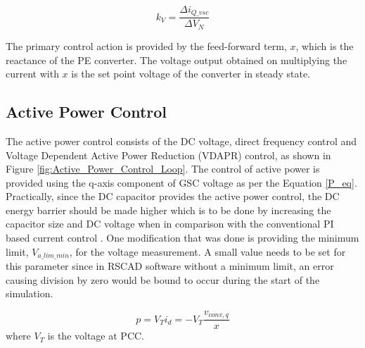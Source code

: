 \begin{equation}
    k_V = \frac{\Delta i_{Q\_vsc}}{\Delta V_N }
\end{equation}

The primary control action is provided by the feed-forward term, $x$, which is the reactance of the \gls{PE} converter. The voltage output obtained on multiplying the current with $x$ is the set point voltage of the converter in steady state.

\subsection{Active Power Control}\label{Active_power_DVC_theory}
The active power control consists of the \gls{DC} voltage, direct frequency control and Voltage Dependent Active Power Reduction (VDAPR) control, as shown in Figure \ref{fig:Active_Power_Control_Loop}. The control of active power is provided using the q-axis component of \gls{GSC} voltage as per the Equation \ref{P_eq}. Practically, since the \gls{DC} capacitor provides the active power control, the \gls{DC} energy barrier should be made higher which is to be done by increasing the capacitor size and \gls{DC} voltage when in comparison with the conventional \gls{PI} based current control \cite{korai_dynamic_2019}. One modification that was done is providing the minimum limit, $V_{a\_lim\_min}$, for the voltage measurement. A small value needs to be set for this parameter since in RSCAD software without a minimum limit, an error causing division by zero would be bound to occur during the start of the simulation. 

\begin{equation}\label{P_eq}
    p = V_Ti_d = -V_T\frac{v_{conv,q}}{x}
\end{equation}
where $V_T$ is the voltage at \gls{PCC}.

